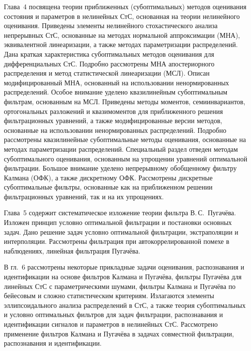 \begin{multicols}{2}
{     Глава~4 посвящена теории приближенных (субоптимальных) методов
оценивания состояния и параметров в нелинейных СтС, основанная на теории
нелинейного оценивания. Приведены элементы нелинейного стохастического
анализа непрерывных СтС, основанные на методах нормальной аппроксимации
(МНА), эквивалентной линеаризации, а также методах параметризации
распределений. Дана краткая характеристика субоптимальных методов оценивания
для диф\-фе\-рен\-циаль\-ных СтС. Подробно рассмотрены МНА апос\-те\-ри\-ор\-но\-го
распределения и метод статистической ли\-не\-а\-ри\-за\-ции (МСЛ). Описан
модифицированный МНА, %
основанный на использовании ненормированных
распределений. Особое внимание уделено квазилинейным субоптимальным
фильтрам, основанным на МСЛ. Приведены методы моментов, семиинвариантов,
ортогональных разложений и квазимоментов для приближенного решения
фильтрационных уравнений, а также модифицированные версии методов,
основанные на использовании ненормированных распределений. Подробно
рассмотрены квазилинейные субоптимальные методы оценивания, основанные на
методах параметризации распределений. Специальный раздел отведен %
 методам
субоптимального оценивания, основанным на упрощении уравнений оптимальной
фильтрации.  Большое внимание уделено непрерывному обобщенному фильтру
Калмана (ОФК), а также дискретному ОФК. Рассмотрены дискретные
субоптимальные фильтры, основанные как на приближенном решении
фильтрационных уравнений, так и на их упрощениях.
{

}

     Глава~5 содержит систематическое изложение теории фильтра В.\,С.~Пугачёва.
Изложен принцип условно оптимальной фильтрации и постановки основных задач.
Дано решение задач условно оптимальной фильтрации, экстраполяции и
интерполяции. Рассмотрены фильтрация при автокоррелированной помехе в
наблюдениях, линейная фильтрация Пугачёва.

     В гл.~6 рассмотрены некоторые прикладные задачи оценивания,
распознавания и идентификации на основе фильтров Калмана и Пугачёва, фильтры
Пугачёва для линейных СтС с параметрическими шумами, фильтры Калмана и
Пугачёва по бейесовым и сложно статистическим критериям. Излагаются элементы
эллипсоидального анализа распределений в СтС, а также теория субоптимальных и
условно оптимальных фильтров для задач фильтрации, распознавания и
идентификации сигналов и параметров в нелинейных СтС. Рас\-смот\-ре\-но применение
фильтров Калмана и Пугачёва в задачах совместной фильтрации, распознавания и
идентификации.

}
\end{multicols}
